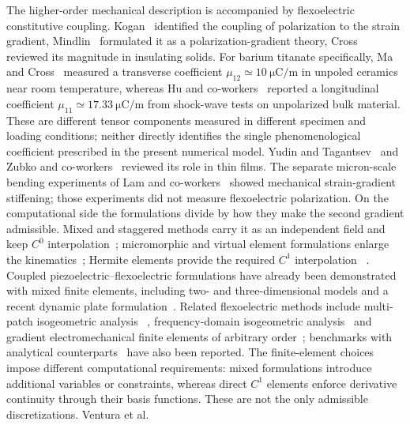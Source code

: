 The higher-order mechanical description is accompanied by flexoelectric
constitutive coupling. Kogan~\cite{Kogan1964} identified the coupling of polarization to the
strain gradient, Mindlin~\cite{Mindlin1968} formulated it as a
polarization-gradient theory, Cross~\cite{Cross2006} reviewed its magnitude in
insulating solids. For barium titanate specifically, Ma and Cross~\cite{MaCross2006}
measured a transverse coefficient $\mu_{12}\simeq\SI{10}{\micro\coulomb\per\meter}$
in unpoled ceramics near room temperature, whereas Hu and co-workers~\cite{HuDengLiangShen2017}
reported a longitudinal coefficient $\mu_{11}\simeq\SI{17.33}{\micro\coulomb\per\meter}$
from shock-wave tests on unpolarized bulk material. These are different
tensor components measured in different specimen and loading conditions;
neither directly identifies the single phenomenological coefficient prescribed
in the present numerical model. Yudin and Tagantsev~\cite{YudinTagantsev2013} and Zubko and
co-workers~\cite{Zubko2013} reviewed its role in thin films. The separate micron-scale bending experiments of Lam and
co-workers~\cite{Lam2003} showed mechanical strain-gradient stiffening;
those experiments did not measure flexoelectric polarization. On the computational side the
formulations divide by how they make the second gradient admissible. Mixed and
staggered methods carry it as an independent field and keep $C^0$
interpolation~\cite{AmanatidouAravas2002,AskesMorataAifantis2008}; micromorphic and virtual element formulations enlarge the
kinematics~\cite{Forest2009,WriggersHudobivnik2023}; Hermite elements provide the required $C^1$ interpolation
~\cite{BognerFoxSchmit1966,PeteraPittman1994,
Papanicolopulos2009}. Coupled piezoelectric--flexoelectric
formulations have already been demonstrated with mixed finite elements,
including two- and three-dimensional models and a recent dynamic plate
formulation~\cite{MaoPurohitAravas2016,SerraoKozinov2024,LiuEtAl2026}.
Related flexoelectric methods include multi-patch isogeometric analysis
~\cite{SharmaAnitescuRabczuk2025}, frequency-domain isogeometric
analysis~\cite{ChenYaoYvonnet2023} and gradient electromechanical finite
elements of arbitrary order~\cite{JoshanSantapuri2024}; benchmarks
with analytical counterparts~\cite{Yang2021} have also been reported. The finite-element choices impose different computational requirements:
mixed formulations introduce additional variables or constraints, whereas
direct $C^1$ elements enforce derivative continuity through their basis
functions.
These are not the only admissible discretizations. Ventura et al.
